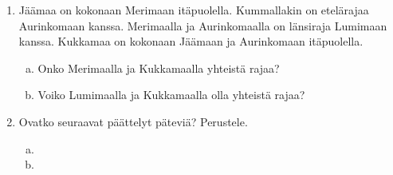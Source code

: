 \begin{enumerate}
    \item Jäämaa on kokonaan Merimaan itäpuolella.
        Kummallakin on etelärajaa Aurinkomaan kanssa.
        Merimaalla ja Aurinkomaalla on länsiraja Lumimaan kanssa.
        Kukkamaa on kokonaan Jäämaan ja Aurinkomaan itäpuolella.
        \begin{enumerate}[a)]
            \item Onko Merimaalla ja Kukkamaalla yhteistä rajaa?
            \item Voiko Lumimaalla ja Kukkamaalla olla yhteistä rajaa?
        \end{enumerate}
    \item Ovatko seuraavat päättelyt päteviä? Perustele.
        \begin{enumerate}[a)]
            \item {}
            \item {}
        \end{enumerate}
\end{enumerate}
